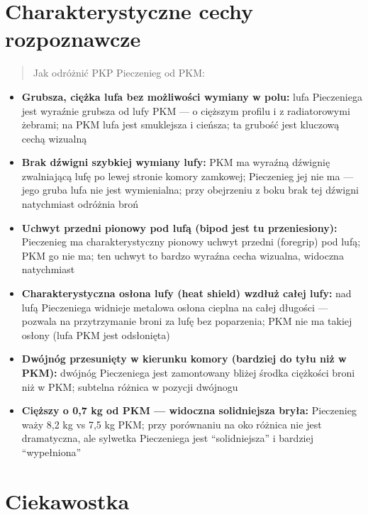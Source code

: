 \documentclass[12pt,openany,oneside]{book}
\providecommand{\tightlist}{%
  \setlength{\itemsep}{0pt}\setlength{\parskip}{0pt}}
\begin{document}
\section{Charakterystyczne cechy
rozpoznawcze}\label{charakterystyczne-cechy-rozpoznawcze-57}

\begin{quote}
Jak odróżnić PKP Pieczenieg od PKM:
\end{quote}

\begin{itemize}
\tightlist
\item
  \textbf{Grubsza, ciężka lufa bez możliwości wymiany w polu:} lufa
  Pieczeniega jest wyraźnie grubsza od lufy PKM --- o cięższym profilu i
  z radiatorowymi żebrami; na PKM lufa jest smuklejsza i cieńsza; ta
  grubość jest kluczową cechą wizualną
\item
  \textbf{Brak dźwigni szybkiej wymiany lufy:} PKM ma wyraźną dźwignię
  zwalniającą lufę po lewej stronie komory zamkowej; Pieczenieg jej nie
  ma --- jego gruba lufa nie jest wymienialna; przy obejrzeniu z boku
  brak tej dźwigni natychmiast odróżnia broń
\item
  \textbf{Uchwyt przedni pionowy pod lufą (bipod jest tu przeniesiony):}
  Pieczenieg ma charakterystyczny pionowy uchwyt przedni (foregrip) pod
  lufą; PKM go nie ma; ten uchwyt to bardzo wyraźna cecha wizualna,
  widoczna natychmiast
\item
  \textbf{Charakterystyczna osłona lufy (heat shield) wzdłuż całej
  lufy:} nad lufą Pieczeniega widnieje metalowa osłona cieplna na całej
  długości --- pozwala na przytrzymanie broni za lufę bez poparzenia;
  PKM nie ma takiej osłony (lufa PKM jest odsłonięta)
\item
  \textbf{Dwójnóg przesunięty w kierunku komory (bardziej do tyłu niż w
  PKM):} dwójnóg Pieczeniega jest zamontowany bliżej środka ciężkości
  broni niż w PKM; subtelna różnica w pozycji dwójnogu
\item
  \textbf{Cięższy o 0,7 kg od PKM --- widoczna solidniejsza bryła:}
  Pieczenieg waży 8,2 kg vs 7,5 kg PKM; przy porównaniu na oko różnica
  nie jest dramatyczna, ale sylwetka Pieczeniega jest ``solidniejsza'' i
  bardziej ``wypełniona''
\end{itemize}

\section{Ciekawostka}\label{ciekawostka-57}
\end{document}
